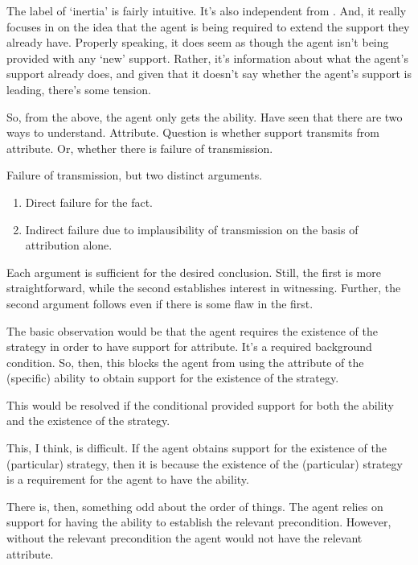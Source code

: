 \documentclass[10pt]{article}
\begin{document}
\begin{note}
  The label of `inertia' is fairly intuitive.
  It's also independent from \citeauthor{Wright:2016wl}.
  And, it really focuses in on the idea that the agent is being required to extend the support they already have.
  Properly speaking, it does seem as though the agent isn't being provided with any `new' support.
  Rather, it's information about what the agent's support already does, and given that it doesn't say whether the agent's support is leading, there's some tension.
\end{note}




\newpage

\begin{note}
  So, from the above, the agent only gets the ability.
  Have seen that there are two ways to understand.
  Attribute.
  Question is whether support transmits from attribute.
  Or, whether there is failure of transmission.

  Failure of transmission, but two distinct arguments.
  \begin{enumerate}
  \item Direct failure for the fact.
  \item Indirect failure due to implausibility of transmission on the basis of attribution alone.
  \end{enumerate}
  Each argument is sufficient for the desired conclusion.
  Still, the first is more straightforward, while the second establishes interest in witnessing.
  Further, the second argument follows even if there is some flaw in the first.
\end{note}

\begin{note}[Hum]
  The basic observation would be that the agent requires the existence of the strategy in order to have support for attribute.
  It's a required background condition.
  So, then, this blocks the agent from using the attribute of the (specific) ability to obtain support for the existence of the strategy.

  This would be resolved if the conditional provided support for both the ability and the existence of the strategy.

  This, I think, is difficult.
  If the agent obtains support for the existence of the (particular) strategy, then it is because the existence of the (particular) strategy is a requirement for the agent to have the ability.

  There is, then, something odd about the order of things.
  The agent relies on support for having the ability to establish the relevant precondition.
  However, without the relevant precondition the agent would not have the relevant attribute.
\end{note}
\end{document}
